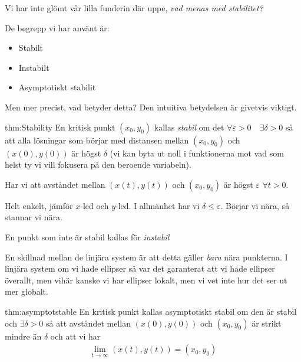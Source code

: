 \par\bigskip
\noindent Vi har inte glömt vår lilla funderin där uppe, \textit{vad menas med stabilitet?}
\par\bigskip
\noindent De begrepp vi har använt är:
\begin{itemize}
  \item Stabilt
  \item Instabilt
  \item Asymptotiskt stabilit
\end{itemize}\par
\noindent Men mer precist, vad betyder detta? Den intuitiva betydelsen är givetvis viktigt.
\par\bigskip
\begin{theo}[Stabilitet]{thm:Stability}
  En kritisk punkt $(x_0,y_0)$ kallas \textit{stabil} om det $\forall\varepsilon >0\quad\exists\delta >0$ så att alla lösningar som börjar med distansen mellan $(x_0,y_0)$ och $(x(0),y(0))$ är högst $\delta$ (vi kan byta ut noll i funktionerna mot vad som helst ty vi vill fokusera på den beroende variabeln).\par
  \noindent Har vi att avståndet mellan $(x(t),y(t))$ och $(x_0,y_0)$ är högst $\varepsilon$ $\forall t>0$. \par\bigskip
  \noindent Helt enkelt, jämför $x$-led och $y$-led. I allmänhet har vi $\delta\leq\varepsilon$. Börjar vi nära, så stannar vi nära.
  \par\bigskip
  \noindent En punkt som inte är stabil kallas för \textit{instabil}
\end{theo}
\par\bigskip
\noindent En skillnad mellan de linjära system är att detta gäller \textit{bara} nära punkterna. I linjära system om vi hade ellipser så var det garanterat att vi hade ellipser överallt, men vihär kanske vi har ellipser lokalt, men vi vet inte hur det ser ut mer globalt. 
\newpage
\begin{theo}{thm:asymptotstable}
  En kritisk punkt kallas asymptotiskt stabil om den är stabil och $\exists\delta>0$ så att avståndet mellan $(x(0), y(0))$ och $(x_0,y_0)$ är strikt mindre än $\delta$ och att vi har
  \begin{equation*}
    \begin{gathered}
      \lim_{t\to\infty}(x(t),y(t)) = (x_0,y_0)
    \end{gathered}
  \end{equation*}
\end{theo}
\par\bigskip
